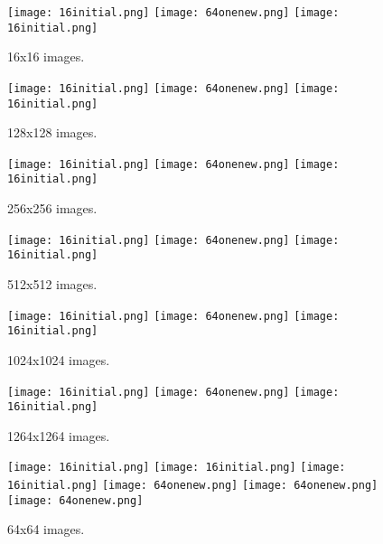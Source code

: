\documentclass{article}
\begin{document}

\begin{multicols}{2}

\begin{figure}[H]
\centering
\texttt{[image: 16initial.png]}
\texttt{[image: 64onenew.png]}
\texttt{[image: 16initial.png]}
\caption{16x16 images.}
\end{figure}

\begin{figure}[H]
\centering
\texttt{[image: 16initial.png]}
\texttt{[image: 64onenew.png]}
\texttt{[image: 16initial.png]}
\caption{128x128 images.}
\end{figure}

\begin{figure}[H]
\centering
\texttt{[image: 16initial.png]}
\texttt{[image: 64onenew.png]}
\texttt{[image: 16initial.png]}
\caption{256x256 images.}
\end{figure}

\begin{figure}[H]
\centering
\texttt{[image: 16initial.png]}
\texttt{[image: 64onenew.png]}
\texttt{[image: 16initial.png]}
\caption{512x512 images.}
\end{figure}

\begin{figure}[H]
\centering
\texttt{[image: 16initial.png]}
\texttt{[image: 64onenew.png]}
\texttt{[image: 16initial.png]}
\caption{1024x1024 images.}
\end{figure}

\begin{figure}[H]
\centering
\texttt{[image: 16initial.png]}
\texttt{[image: 64onenew.png]}
\texttt{[image: 16initial.png]}
\caption{1264x1264 images.}
\end{figure}

\end{multicols}

\begin{figure}[H]
\centering
\texttt{[image: 16initial.png]}
\texttt{[image: 16initial.png]}
\texttt{[image: 16initial.png]}
\texttt{[image: 64onenew.png]}
\texttt{[image: 64onenew.png]}
\texttt{[image: 64onenew.png]}
\caption{64x64 images.}
\end{figure}
\end{document}
